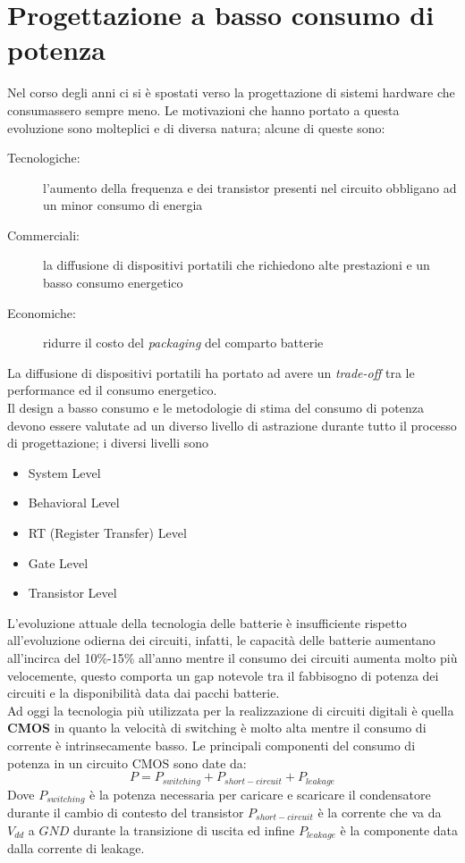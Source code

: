 \section{Progettazione a basso consumo di potenza}\label{capitolo5}
Nel corso degli anni ci si è spostati verso la progettazione di sistemi hardware che consumassero sempre meno. Le motivazioni che hanno portato a questa evoluzione sono molteplici e di diversa natura; alcune di queste sono:
\begin{description}
\item[Tecnologiche:] l'aumento della frequenza e dei transistor presenti nel circuito obbligano ad un minor consumo di energia
\item[Commerciali:] la diffusione di dispositivi portatili che richiedono alte prestazioni e un basso consumo energetico
\item[Economiche:] ridurre il costo del \emph{packaging} del comparto batterie
\end{description}
La diffusione di dispositivi portatili ha portato ad avere un \emph{trade-off} tra le performance ed il consumo energetico.\\
Il design a basso consumo e le metodologie di stima del consumo di potenza devono essere valutate ad un diverso livello di astrazione durante tutto il processo di progettazione; i diversi livelli sono
\begin{itemize}
\item System Level
\item Behavioral Level
\item RT (Register Transfer) Level
\item Gate Level
\item Transistor Level
\end{itemize}
L'evoluzione attuale della tecnologia delle batterie è insufficiente rispetto all'evoluzione odierna dei circuiti, infatti, le capacità delle batterie aumentano all'incirca del 10\%-15\% all'anno mentre il consumo dei circuiti aumenta molto più velocemente, questo comporta un gap notevole tra il fabbisogno di potenza dei circuiti e la disponibilità data dai pacchi batterie.\\
Ad oggi la tecnologia più utilizzata per la realizzazione di circuiti digitali è quella \textbf{CMOS} in quanto la velocità di switching è molto alta mentre il consumo di corrente è intrinsecamente basso.
Le principali componenti del consumo di potenza in un circuito CMOS sono date da:
$$P=P_{switching}+P_{short-circuit}+P_{leakage}$$
Dove $P_{switching}$ è la potenza necessaria per caricare e scaricare il condensatore durante il cambio di contesto del transistor $P_{short-circuit}$ è la corrente che va da $V_{dd}$ a $GND$ durante la transizione di uscita ed infine $P_{leakage}$ è la componente data dalla corrente di leakage.\\
